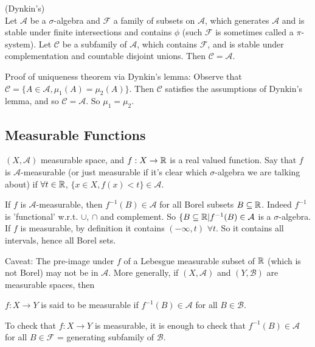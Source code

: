 \documentclass[a4paper]{article}
\begin{document}
\begin{lemma} (Dynkin's)\\
Let $\mathcal{A}$ be a $\sigma$-algebra and $\mathcal{F}$ a family of subsets on $\mathcal{A}$, which generates $\mathcal{A}$ and is stable under finite intersections and contains $\phi$ (such $\mathcal{F}$ is sometimes called a $\pi$-system). Let $\mathcal{C}$ be a subfamily of $\mathcal{A}$, which contains $\mathcal{F}$, and is stable under complementation and countable disjoint unions. Then $\mathcal{C} = \mathcal{A}$.
\end{lemma}

Proof of uniqueness theorem via Dynkin's lemma: Observe that $\mathcal{C} = \{A \in \mathcal{A},\mu_1(A) =\mu_2(A)\}$. Then $\mathcal{C}$ satisfies the assumptions of Dynkin's lemma, and so $\mathcal{C} = \mathcal{A}$. So $\mu_1 = \mu_2$.

\subsection{Measurable Functions}
\begin{defi}
$(X,\mathcal{A})$ measurable space, and $f:X \to \mathbb{R}$ is a real valued function. Say that $f$ is $\mathcal{A}$-measurable (or just measurable if it's clear which $\sigma$-algebra we are talking about) if $\forall t \in \mathbb{R}$, $\{x \in X, f(x)<t\} \in \mathcal{A}$. 
\end{defi}

\begin{rem}
If $f$ is $\mathcal{A}$-measurable, then $f^{-1}(B) \in \mathcal{A}$ for all Borel subsets $B \subseteq \mathbb{R}$. Indeed $f^{-1}$ is 'functional' w.r.t. $\cup$, $\cap$ and complement. So $\{B \subseteq \mathbb{R} | f^{-1}(B) \in \mathcal{A}$ is a $\sigma$-algebra. If $f$ is measurable, by definition it contains $(-\infty,t)$ $\forall t$. So it contains all intervals, hence all Borel sets.
\end{rem}

Caveat: The pre-image under $f$ of a Lebesgue measurable subset of $\mathbb{R}$ (which is not Borel) may not be in $\mathcal{A}$. More generally, if $(X,\mathcal{A})$ and $(Y,\mathcal{B})$ are measurable spaces, then
\begin{defi}
$f:X \to Y$ is said to be measurable if $f^{-1}(B) \in \mathcal{A}$ for all $B \in \mathcal{B}$.
\end{defi}

\begin{rem}
To check that $f:X \to Y$ is measurable, it is enough to check that $f^{-1}(B) \in \mathcal{A}$ for all $B \in \mathcal{F}$ = generating subfamily of $\mathcal{B}$.
\end{rem}
\end{document}
